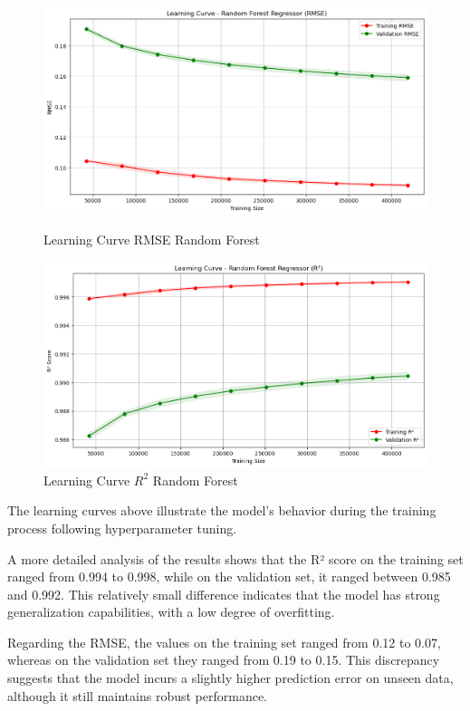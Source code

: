 \begin{figure}[H]
\centering
\begin{minipage}{0.48\textwidth}
  \centering
  \includegraphics[width=\linewidth]{images/lc-RF-rmse.png}
  \caption{Learning Curve RMSE Random Forest}
  \label{fig:imagem1}
\end{minipage}
\hfill
\begin{minipage}{0.48\textwidth}
  \centering
  \includegraphics[width=\linewidth]{images/lc-RF-r2.png}
  \caption{Learning Curve $R^2$ Random Forest}
  \label{fig:imagem2}
\end{minipage}
\end{figure}

The learning curves above illustrate the model's behavior during the training process following hyperparameter tuning.

A more detailed analysis of the results shows that the R² score on the training set ranged from 0.994 to 0.998, while on the validation set, it ranged between 0.985 and 0.992. This relatively small difference indicates that the model has strong generalization capabilities, with a low degree of overfitting.

Regarding the RMSE, the values on the training set ranged from 0.12 to 0.07, whereas on the validation set they ranged from 0.19 to 0.15. This discrepancy suggests that the model incurs a slightly higher prediction error on unseen data, although it still maintains robust performance.

